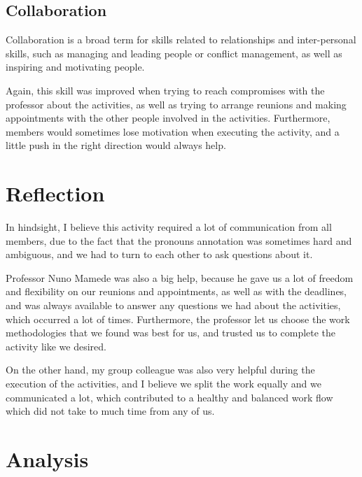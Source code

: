 \documentclass[a4paper,12pt,journal,twoside,compsoc]{PPIEEEtran}
\begin{document}
\subsection{Collaboration}

Collaboration is a broad term for skills related to relationships and inter-personal skills, such as managing and leading people or conflict management, as well as inspiring and motivating people.

Again, this skill was improved when trying to reach compromises with the professor about the activities, as well as trying to arrange reunions and making appointments with the other people involved in the activities. Furthermore, members would sometimes lose motivation when executing the activity, and a little push in the right direction would always help.


\section{Reflection}
\label{reflection}

In hindsight, I believe this activity required a lot of communication from all members, due to the fact that the pronouns annotation was sometimes hard and ambiguous, and we had to turn to each other to ask questions about it.

Professor Nuno Mamede was also a big help, because he gave us a lot of freedom and flexibility on our reunions and appointments, as well as with the deadlines, and was always available to answer any questions we had about the activities, which occurred a lot of times. Furthermore, the professor let us choose the work methodologies that we found was best for us, and trusted us to complete the activity like we desired. 

On the other hand, my group colleague was also very helpful during the execution of the activities, and I believe we split the work equally and we communicated a lot, which contributed to a healthy and balanced work flow which did not take to much time from any of us.


\section{Analysis}
\label{analysis}
\end{document}
